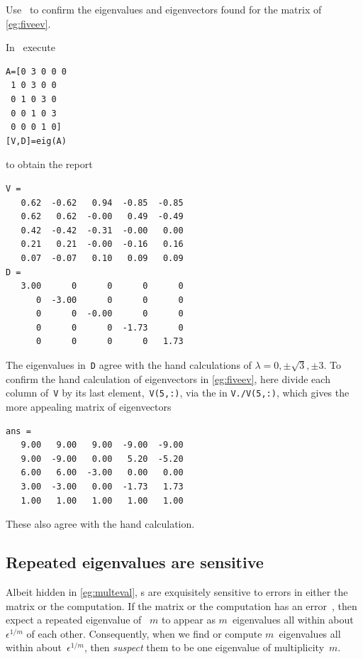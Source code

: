 \begin{example} \label{eg:fiveevm}
Use \script\ to confirm the eigenvalues and eigenvectors found for the matrix of \cref{eg:fiveev}.
\begin{solution} 
In \script\ execute
\begin{verbatim}
A=[0 3 0 0 0
 1 0 3 0 0
 0 1 0 3 0
 0 0 1 0 3
 0 0 0 1 0]
[V,D]=eig(A)
\end{verbatim}
\setbox\ajrqrbox\hbox{}%
\marginajrbox%
to obtain the report \twodp
\begin{verbatim}
V =
   0.62  -0.62   0.94  -0.85  -0.85
   0.62   0.62  -0.00   0.49  -0.49
   0.42  -0.42  -0.31  -0.00   0.00
   0.21   0.21  -0.00  -0.16   0.16
   0.07  -0.07   0.10   0.09   0.09
D =
   3.00      0      0      0      0
      0  -3.00      0      0      0
      0      0  -0.00      0      0
      0      0      0  -1.73      0
      0      0      0      0   1.73
\end{verbatim}
The eigenvalues in~\verb|D| agree with the hand calculations of \(\lambda=0,\pm\sqrt3,\pm3\).
To confirm the hand calculation of eigenvectors in \cref{eg:fiveev}, here divide each column of~\verb|V| by its last element,~\verb|V(5,:)|, via the  in \verb|V./V(5,:)|, which gives the more appealing matrix of eigenvectors \twodp
\begin{verbatim}
ans =
   9.00   9.00   9.00  -9.00  -9.00
   9.00  -9.00   0.00   5.20  -5.20
   6.00   6.00  -3.00   0.00   0.00
   3.00  -3.00   0.00  -1.73   1.73
   1.00   1.00   1.00   1.00   1.00
\end{verbatim}
These also agree with the hand calculation.
\end{solution}
\end{example}







\subsection{Repeated eigenvalues are sensitive}
\label{sec:reas}



Albeit hidden in \cref{eg:multeval}, s are exquisitely sensitive to errors in either the matrix or the computation.
If the matrix or the computation has an error~\idx{$\epsilon$}, then expect a repeated eigenvalue of ~\(m\) to appear as \(m\)~eigenvalues all within about~\(\epsilon^{1/m}\) of each other.
Consequently, when we find or compute \(m\)~eigenvalues all within about~\(\epsilon^{1/m}\), then \emph{suspect} them to be one eigenvalue of multiplicity~\(m\).

